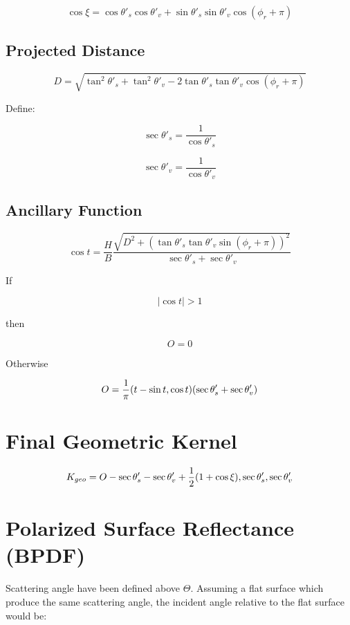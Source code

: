 \documentclass[
  letterpaper,
  open=any]{scrbook}
\begin{document}
\[
\cos\xi =
\cos\theta'_s\cos\theta'_v +
\sin\theta'_s\sin\theta'_v\cos(\phi_r+\pi)
\]

\subsection{Projected Distance}\label{projected-distance}

\[
D =
\sqrt{
\tan^2\theta'_s +
\tan^2\theta'_v -
2\tan\theta'_s\tan\theta'_v\cos(\phi_r+\pi)
}
\]

Define:

\[
\sec\theta'_s = \frac{1}{\cos\theta'_s}
\]

\[
\sec\theta'_v = \frac{1}{\cos\theta'_v}
\]

\subsection{\texorpdfstring{Ancillary Function
}{Ancillary Function }}\label{ancillary-function}

\[
\cos t =
\frac{H}{B}\frac{
\sqrt{
D^2 + (\tan\theta'_s\tan\theta'_v\sin(\phi_r+\pi))^2
}}
{\sec\theta'_s + \sec\theta'_v}
\]

If

\[
|\cos t| > 1
\]

then

\[
O = 0
\]

Otherwise

\[
O =
\frac{1}{\pi}(t - \sin t \\, \cos t)
(\sec\theta'_s + \sec\theta'_v)
\]

\section{Final Geometric Kernel}\label{final-geometric-kernel}

\[
K_{geo} = O - \sec\theta'_s - \sec\theta'_v + \frac{1}{2}(1+\cos\xi) \\, \sec\theta'_s \\,  \sec\theta'_v
\]

\section{Polarized Surface Reflectance
(BPDF)}\label{polarized-surface-reflectance-bpdf}

Scattering angle have been defined above \(\Theta\). Assuming a flat
surface which produce the same scattering angle, the incident angle
relative to the flat surface would be:
\end{document}
